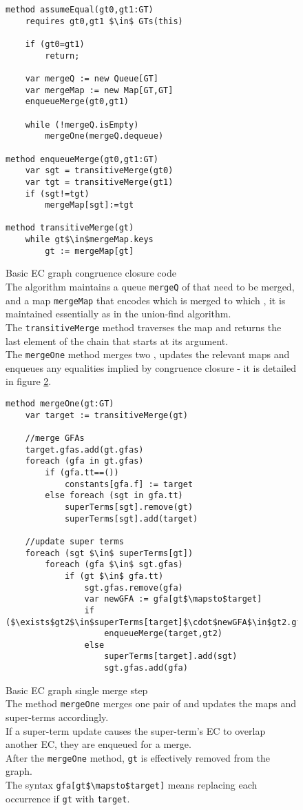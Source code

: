 \begin{figure}
\begin{lstlisting}
method assumeEqual(gt0,gt1:GT)
	requires gt0,gt1 $\in$ GTs(this)
	
	if (gt0=gt1)
		return;
	
	var mergeQ := new Queue[GT]
	var mergeMap := new Map[GT,GT]
	enqueueMerge(gt0,gt1)
	
	while (!mergeQ.isEmpty)
		mergeOne(mergeQ.dequeue)
		
method enqueueMerge(gt0,gt1:GT)
	var sgt = transitiveMerge(gt0)
	var tgt = transitiveMerge(gt1)
	if (sgt!=tgt)
		mergeMap[sgt]:=tgt
		
method transitiveMerge(gt)
	while gt$\in$mergeMap.keys
		gt := mergeMap[gt]
\end{lstlisting}
\caption{Basic EC graph congruence closure code\\
The algorithm maintains a queue \lstinline|mergeQ| of \GTs{} that need to be merged,\\
and a map \lstinline|mergeMap| that encodes which \GT{} is merged to which \GT{}, 
it is maintained essentially as in the union-find algorithm.\\
The \lstinline|transitiveMerge| method traverses the map and returns the last element of the chain that starts at its argument.\\
The \lstinline|mergeOne| method merges two \GTs{}, updates the relevant maps and enqueues any equalities implied by congruence closure - it is detailed in figure \ref{fig_basic_ECGraph_mergeOne}.
}
\label{fig_basic_ECGraph_assumeEqual}
\end{figure}
\begin{figure}
\begin{lstlisting}
method mergeOne(gt:GT)
	var target := transitiveMerge(gt)
	
	//merge GFAs
	target.gfas.add(gt.gfas)
	foreach (gfa in gt.gfas)
		if (gfa.tt==())
			constants[gfa.f] := target
		else foreach (sgt in gfa.tt)
			superTerms[sgt].remove(gt)
			superTerms[sgt].add(target)
			
	//update super terms
	foreach (sgt $\in$ superTerms[gt])
		foreach (gfa $\in$ sgt.gfas)
			if (gt $\in$ gfa.tt)
				sgt.gfas.remove(gfa)
				var newGFA := gfa[gt$\mapsto$target]
				if ($\exists$gt2$\in$superTerms[target]$\cdot$newGFA$\in$gt2.gfas)
					enqueueMerge(target,gt2)
				else
					superTerms[target].add(sgt)
					sgt.gfas.add(gfa)
\end{lstlisting}
\caption{Basic EC graph single merge step\\
The method \lstinline|mergeOne| merges one pair of \GTs{} and updates the maps and super-terms accordingly.\\
If a super-term update causes the super-term's EC to overlap another EC, they are enqueued for a merge.\\
After the \lstinline|mergeOne| method, \lstinline|gt| is effectively removed from the graph.\\
The syntax \lstinline|gfa[gt$\mapsto$target]| means replacing each occurrence if \lstinline|gt| with \lstinline|target|.
}
\label{fig_basic_ECGraph_mergeOne}
\end{figure}


